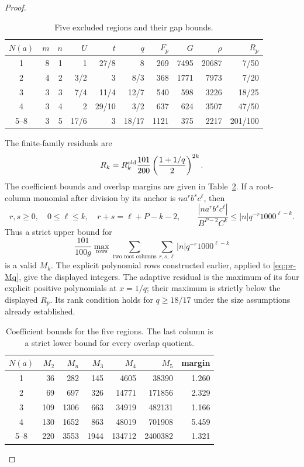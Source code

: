 \documentclass[12pt]{article}
\numberwithin{equation}{section}
\begin{document}
\begin{proof}
\begin{table}[htbp]
\centering\small
\caption{Five excluded regions and their gap bounds.}
\label{tab:pr-five-regions}
\begin{tabular}{c|rrrrrrrrr}
\(N(a)\)&\(m\)&\(n\)&\(U\)&\(t\)&\(q\)&\(F_p\)&\(G\)&\(\rho\)&\(R_p\)\\\hline
1&8&1&1&27/8&8&269&7495&20687&7/50\\
2&4&2&3/2&3&8/3&368&1771&7973&7/20\\
3&3&3&7/4&11/4&12/7&540&598&3226&18/25\\
4&3&4&2&29/10&3/2&637&624&3507&47/50\\
5--8&3&5&17/6&3&18/17&1121&375&2217&201/100
\end{tabular}
\end{table}
The finite-family residuals are
\begin{equation}\label{eq:pr-ratio-residual}
 R_k=R_k^{\rm old}\frac{101}{200}
             \left(\frac{1+1/q}{2}\right)^{2k}.
\end{equation}
The coefficient bounds and overlap margins are given in
Table~\ref{tab:pr-five-coefficients}. If a root-column monomial after division by its
anchor is \(n a^r b^s c^\ell\), then
\[
 r,s\ge0,\quad0\le\ell\le k,\quad r+s=\ell+P-k-2,
 \qquad
 \frac{|n a^r b^s c^\ell|}{B^{P-2}C^k}
 \le |n|q^{-r}1000^{\ell-k}.
\]
Thus a strict upper bound for
\begin{equation}\label{eq:pr-Mq}
 \frac{101}{100g}\max_{\text{rows}}
       \sum_{\text{two root columns}}\sum_{r,s,\ell}
                    |n|q^{-r}1000^{\ell-k}
\end{equation}
is a valid \(M_k\). The explicit polynomial rows constructed earlier,
applied to \eqref{eq:pr-Mq}, give the displayed integers.
The adaptive residual is the maximum of its four explicit positive
polynomials at \(x=1/q\); their maximum is strictly below the displayed
\(R_p\). Its rank condition holds for \(q\ge18/17\) under the size
assumptions already established.
\begin{table}[htbp]
\centering\small
\caption{Coefficient bounds for the five regions. The last column is a
strict lower bound for every overlap quotient.}
\label{tab:pr-five-coefficients}
\begin{tabular}{c|rrrrrr}
\(N(a)\)&\(M_2\)&\(M_n\)&\(M_3\)&\(M_4\)&\(M_5\)&margin\\\hline
1&36&282&145&4605&38390&1.260\\
2&69&697&326&14771&171856&2.329\\
3&109&1306&663&34919&482131&1.166\\
4&130&1652&863&48019&701908&5.459\\
5--8&220&3553&1944&134712&2400382&1.321
\end{tabular}
\end{table}


\end{proof}
\end{document}
